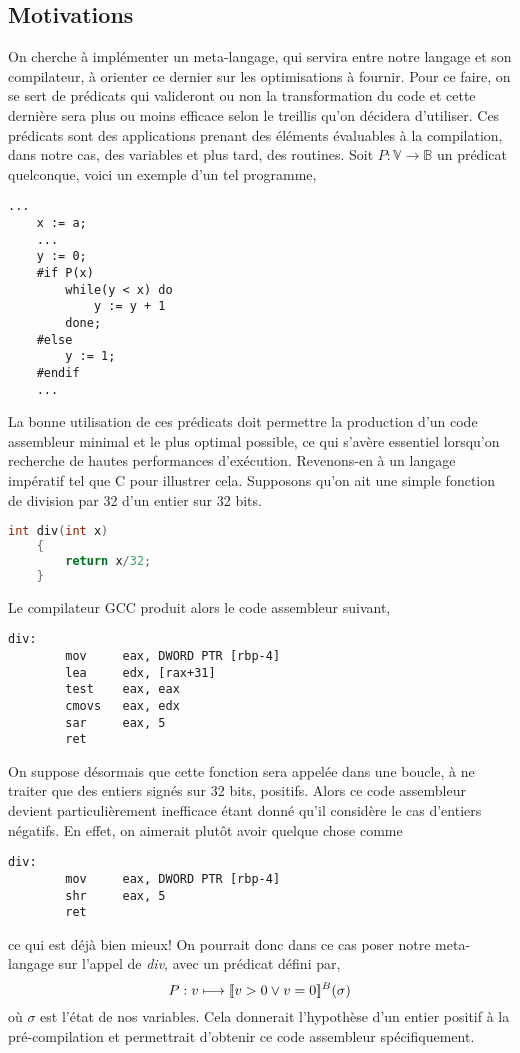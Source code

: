 \documentclass[a4paper, 10pt]{article}
\begin{document}
\subsection{Motivations}
On cherche à implémenter un meta-langage, qui servira entre notre langage et son compilateur, à orienter
ce dernier sur les optimisations à fournir. Pour ce faire, on se sert de prédicats qui valideront ou non la
transformation du code et cette dernière sera plus ou moins efficace selon le treillis qu'on décidera d'utiliser. 
Ces prédicats sont des applications prenant des éléments évaluables à la compilation, 
dans notre cas, des variables et plus tard, des routines.
Soit $P : \mathbb{V} \longrightarrow \mathbb{B}$ un prédicat quelconque, voici un exemple d'un tel programme,
\begin{lstlisting}[tabsize=2]
	...
	x := a;
	...
	y := 0;
	#if P(x)
		while(y < x) do
			y := y + 1
		done;
	#else
		y := 1;
	#endif
	...
\end{lstlisting}
La bonne utilisation de ces prédicats doit permettre la production d'un code assembleur minimal et le plus
optimal possible, ce qui s'avère essentiel lorsqu'on recherche de hautes performances d'exécution.
Revenons-en à un langage impératif tel que C pour illustrer cela. Supposons qu'on ait une simple fonction de division 
par 32 d'un entier sur 32 bits.
\begin{lstlisting}[tabsize=2, language=c]
	int div(int x)
	{
		return x/32;
	}
\end{lstlisting}
Le compilateur GCC produit alors le code assembleur suivant,
\begin{lstlisting}[tabsize=2]
	div:
		mov     eax, DWORD PTR [rbp-4]
		lea     edx, [rax+31]
		test    eax, eax
		cmovs   eax, edx
		sar     eax, 5
		ret
\end{lstlisting}
On suppose désormais que cette fonction sera appelée dans une boucle, à ne traiter que des entiers signés sur 32 bits, positifs.
Alors ce code assembleur devient particulièrement inefficace étant donné qu'il considère le cas d'entiers
négatifs. En effet, on aimerait plutôt avoir quelque chose comme
\begin{lstlisting}[tabsize=2]
	div:
		mov     eax, DWORD PTR [rbp-4]
		shr     eax, 5
		ret
\end{lstlisting}
ce qui est déjà bien mieux! On pourrait donc dans ce cas poser notre meta-langage sur l'appel de \textit{div}, avec un prédicat
défini par,
\[P : v \longmapsto [\![{v > 0 \vee v = 0}]\!]^{B}(\sigma)\]
où $\sigma$ est l'état de nos variables. Cela donnerait l'hypothèse d'un entier positif à la pré-compilation
et permettrait d'obtenir ce code assembleur spécifiquement.
\end{document}
